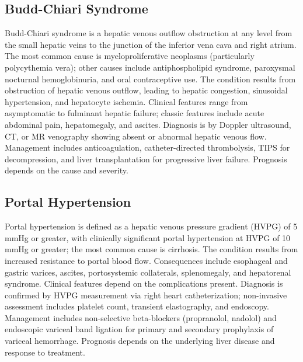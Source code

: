 \subsection{Budd-Chiari Syndrome}
\label{sec:Budd-Chiari Syndrome}
Budd-Chiari syndrome is a hepatic venous outflow obstruction at any level from the small hepatic veins to the junction of the inferior vena cava and right atrium. The most common cause is myeloproliferative neoplasms (particularly polycythemia vera); other causes include antiphospholipid syndrome, paroxysmal nocturnal hemoglobinuria, and oral contraceptive use. The condition results from obstruction of hepatic venous outflow, leading to hepatic congestion, sinusoidal hypertension, and hepatocyte ischemia. Clinical features range from asymptomatic to fulminant hepatic failure; classic features include acute abdominal pain, hepatomegaly, and ascites. Diagnosis is by Doppler ultrasound, CT, or MR venography showing absent or abnormal hepatic venous flow. Management includes anticoagulation, catheter-directed thrombolysis, TIPS for decompression, and liver transplantation for progressive liver failure. Prognosis depends on the cause and severity.

\subsection{Portal Hypertension}
\label{sec:Portal Hypertension}
Portal hypertension is defined as a hepatic venous pressure gradient (HVPG) of 5 mmHg or greater, with clinically significant portal hypertension at HVPG of 10 mmHg or greater; the most common cause is cirrhosis. The condition results from increased resistance to portal blood flow. Consequences include esophageal and gastric varices, ascites, portosystemic collaterals, splenomegaly, and hepatorenal syndrome. Clinical features depend on the complications present. Diagnosis is confirmed by HVPG measurement via right heart catheterization; non-invasive assessment includes platelet count, transient elastography, and endoscopy. Management includes non-selective beta-blockers (propranolol, nadolol) and endoscopic variceal band ligation for primary and secondary prophylaxis of variceal hemorrhage. Prognosis depends on the underlying liver disease and response to treatment.

